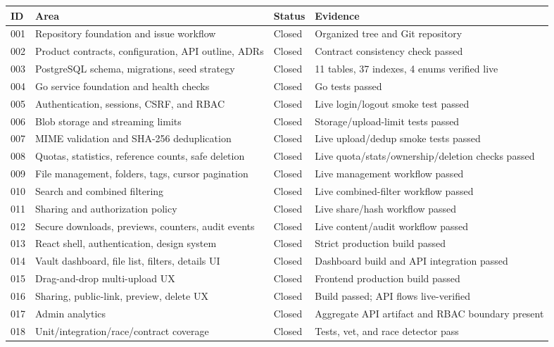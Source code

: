\documentclass[11pt,a4paper]{article}
\begin{document}
\begin{longtable}{p{}p{}p{}p{}}
\toprule
ID & Area & Status & Evidence \\
\midrule
001 & Repository foundation and issue workflow & Closed & Organized tree and Git repository \\
002 & Product contracts, configuration, API outline, ADRs & Closed & Contract consistency check passed \\
003 & PostgreSQL schema, migrations, seed strategy & Closed & 11 tables, 37 indexes, 4 enums verified live \\
004 & Go service foundation and health checks & Closed & Go tests passed \\
005 & Authentication, sessions, CSRF, and RBAC & Closed & Live login/logout smoke test passed \\
006 & Blob storage and streaming limits & Closed & Storage/upload-limit tests passed \\
007 & MIME validation and SHA-256 deduplication & Closed & Live upload/dedup smoke tests passed \\
008 & Quotas, statistics, reference counts, safe deletion & Closed & Live quota/stats/ownership/deletion checks passed \\
009 & File management, folders, tags, cursor pagination & Closed & Live management workflow passed \\
010 & Search and combined filtering & Closed & Live combined-filter workflow passed \\
011 & Sharing and authorization policy & Closed & Live share/hash workflow passed \\
012 & Secure downloads, previews, counters, audit events & Closed & Live content/audit workflow passed \\
013 & React shell, authentication, design system & Closed & Strict production build passed \\
014 & Vault dashboard, file list, filters, details UI & Closed & Dashboard build and API integration passed \\
015 & Drag-and-drop multi-upload UX & Closed & Frontend production build passed \\
016 & Sharing, public-link, preview, delete UX & Closed & Build passed; API flows live-verified \\
017 & Admin analytics & Closed & Aggregate API artifact and RBAC boundary present \\
018 & Unit/integration/race/contract coverage & Closed & Tests, vet, and race detector pass \\

\end{longtable}
\end{document}
